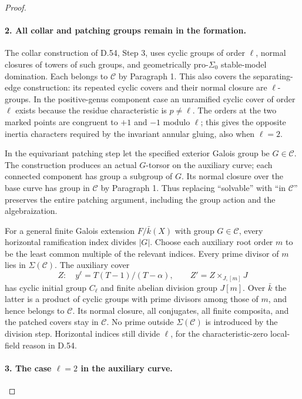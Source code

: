 \begin{proof}
\paragraph{2. All collar and patching groups remain in the formation.}

The collar construction of D.54, Step 3, uses cyclic groups of
order $\ell$, normal closures of towers of such groups, and
geometrically pro-$\Sigma_0$ stable-model domination.  Each belongs
to $\mathcal C$ by Paragraph 1.  This also covers the separating-edge
construction: its repeated cyclic covers and their normal closure
are $\ell$-groups.  In the positive-genus component case an
unramified cyclic cover of order $\ell$ exists because the residue
characteristic is $p\ne\ell$.  The orders at the two marked points
are congruent to $+1$ and $-1$ modulo $\ell$; this gives the
opposite inertia characters required by the invariant annular
gluing, also when $\ell=2$.

In the equivariant patching step let the specified exterior
Galois group be $G\in\mathcal C$.  The construction produces an
actual $G$-torsor on the auxiliary curve; each connected component
has group a subgroup of $G$.  Its normal closure over the base
curve has group in $\mathcal C$ by Paragraph 1.  Thus replacing
``solvable'' with ``in $\mathcal C$'' preserves the entire patching
argument, including the group action and the algebraization.

For a general finite Galois extension $F/\bar k(X)$ with group
$G\in\mathcal C$, every horizontal ramification index divides
$|G|$.  Choose each auxiliary root order $m$ to be the least common
multiple of the relevant indices.  Every prime divisor of $m$
lies in $\Sigma(\mathcal C)$.  The auxiliary cover
\[
 Z:\quad y^\ell=T(T-1)/(T-\alpha),\qquad
 Z'=Z\times_{J,[m]}J
\]
has cyclic initial group $C_\ell$ and finite abelian division
group $J[m]$.  Over $\bar k$ the latter is a product of cyclic
groups with prime divisors among those of $m$, and hence belongs
to $\mathcal C$.  Its normal closure, all conjugates, all finite
composita, and the patched covers stay in $\mathcal C$.  No prime
outside $\Sigma(\mathcal C)$ is introduced by the division step.
Horizontal indices still divide $\ell$, for the characteristic-zero
local-field reason in D.54.

\paragraph{3. The case $\ell=2$ in the auxiliary curve.}


\end{proof}
